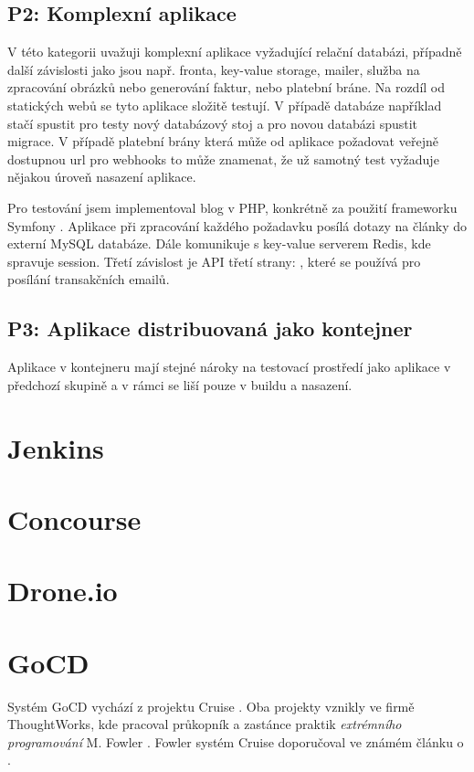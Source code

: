         \subsection{P2: Komplexní aplikace}
            V této kategorii uvažuji komplexní aplikace vyžadující relační databázi, případně další závislosti jako jsou např. fronta, key-value storage, mailer, služba na zpracování obrázků nebo generování faktur, nebo platební bráne. Na rozdíl od statických webů se tyto aplikace složitě testují. V případě databáze například stačí spustit pro testy nový databázový stoj a pro novou databázi spustit migrace. V případě platební brány která může od aplikace požadovat veřejně dostupnou url pro webhooks to může znamenat, že už samotný test vyžaduje nějakou úroveň nasazení aplikace. 

            Pro testování jsem implementoval blog v PHP, konkrétně za použití frameworku Symfony \cite{symfony}. Aplikace při zpracování každého požadavku posílá dotazy na články do externí MySQL databáze. Dále komunikuje s key-value serverem Redis, kde spravuje session. Třetí závislost je API třetí strany: , které se používá pro posílání transakčních emailů.


        \subsection{P3: Aplikace distribuovaná jako kontejner}
            Aplikace v kontejneru mají stejné nároky na testovací prostředí jako aplikace v předchozí skupině a v rámci \CICD se liší pouze v buildu a nasazení.

            \blind[1]

    \section{Jenkins}
    \section{Concourse}
    \section{Drone.io}

    

    \section{GoCD}
        Systém GoCD vychází z projektu Cruise \cite{thoughtworks-gocd}. Oba projekty vznikly ve firmě ThoughtWorks, kde pracoval průkopník a zastánce praktik \textit{extrémního programování} M. Fowler \cite{fowler-go}. Fowler systém Cruise doporučoval ve známém článku o \CI \cite{fowler-ci}.

